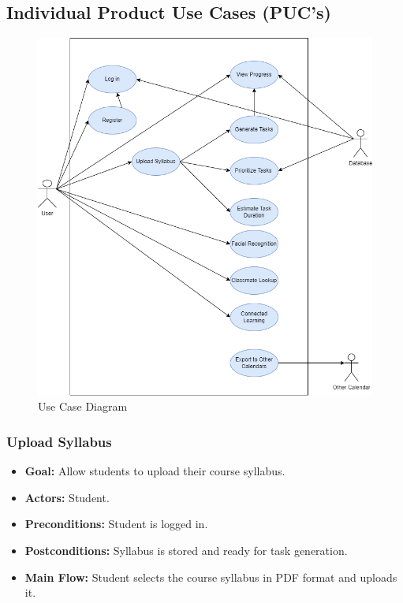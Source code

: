 \documentclass[12pt]{article}
\begin{document}
\subsection{Individual Product Use Cases (PUC’s)}
\begin{figure}[htbp]
    \centering
    \includegraphics[width=1.0\linewidth]{Use Case Diagram.drawio.png} 
    \caption{Use Case Diagram}
\end{figure}


\subsubsection{Upload Syllabus}
\begin{itemize}
    \item \textbf{Goal:} Allow students to upload their course syllabus.
    \item \textbf{Actors:} Student.
    \item \textbf{Preconditions:} Student is logged in.
    \item \textbf{Postconditions:} Syllabus is stored and ready for task generation.
    \item \textbf{Main Flow:} Student selects the course syllabus in PDF format and uploads it.
\end{itemize}
\end{document}
